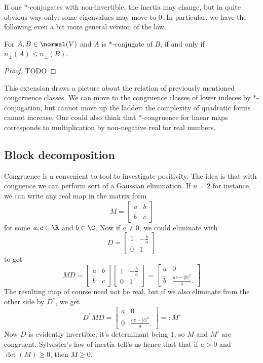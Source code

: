 If one $*$-conjugates with non-invertible, the inertia may change, but in quite obvious way only: some eigenvalues may move to $0$. In particular, we have the following even a bit more general version of the law.

\begin{lause}
	For $A, B \in \normal(V)$ and $A$ is $*$-conjugate of $B$, if and only if $n_{\pm}(A) \leq n_{\pm}(B)$.
\end{lause}
\begin{proof}
	TODO
\end{proof}

This extension draws a picture about the relation of previously mentioned congcruence classes. We can move to the congruence classes of lower indeces by $*$-conjugation, but cannot move up the ladder: the complexity of quadratic forms cannot increase. One could also think that $*$-congruence for linear maps corresponds to multiplication by non-negative real for real numbers.

\subsection{Block decomposition}

Congruence is a convenient to tool to investigate positivity. The idea is that with conguence we can perform sort of a Gaussian elimination. If $n = 2$ for instance, we can write any real map in the matrix form
\[
	M =
	\begin{bmatrix}
		a & b \\
		\overline{b} & c
	\end{bmatrix}
\]
for some $a, c \in \R$ and $b \in \C$. Now if $a \neq 0$, we could eliminate with
\[
	D =
	\begin{bmatrix}
		1 & -\frac{b}{a} \\
		0 & 1
	\end{bmatrix}
\]
to get
\[
	M D =
	\begin{bmatrix}
		a & b \\
		\overline{b} & c
	\end{bmatrix}
	\begin{bmatrix}
		1 & -\frac{b}{a} \\
		0 & 1
	\end{bmatrix}
	=
	\begin{bmatrix}
		a & 0 \\
		\overline{b} & \frac{a c - |b|^2}{a}.
	\end{bmatrix}
\]
The resulting map of course need not be real, but if we also eliminate from the other side by $D^{*}$, we get
\[
	D^{*} M D =
	\begin{bmatrix}
		a & 0 \\
		0 & \frac{a c - |b|^2}{a}.
	\end{bmatrix}
	=: M'
\]
Now $D$ is evidently invertible, it's determinant being $1$, so $M$ and $M'$ are congruent. Sylvester's law of inertia tell's us hence that that if $a > 0$ and $\det(M) \geq 0$, then $M \geq 0$.

